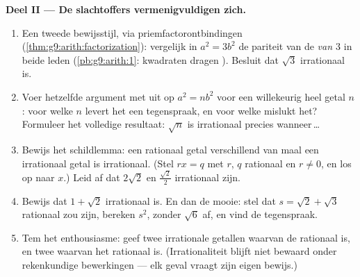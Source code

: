 \begin{problem}
\medskip
\noindent\textbf{Deel II --- De slachtoffers vermenigvuldigen zich.}
\begin{enumerate}[resume]
  \item Een tweede bewijsstijl, via priemfactorontbindingen
        (\cref{thm:g9:arith:factorization}): vergelijk in $a^2 = 3b^2$ de pariteit
        van de \emph{ van $3$} in beide leden (\cref{pb:g9:arith:1}:
        kwadraten dragen  ). Besluit dat $\sqrt3$ irrationaal is.
  \item Voer hetzelfde argument met  uit op $a^2 = n b^2$ voor een
        willekeurig heel getal $n$: voor welke $n$ levert het een tegenspraak, en
        voor welke mislukt het? Formuleer het volledige resultaat: $\sqrt n$ is
        irrationaal precies wanneer\,\dots
  \item Bewijs het schildlemma: een rationaal getal verschillend van  maal een
        irrationaal getal is irrationaal. (Stel $r x = q$ met $r$, $q$ rationaal en
        $r \neq 0$, en los op naar $x$.) Leid af dat $2\sqrt2$ en
        $\frac{\sqrt2}{2}$ irrationaal zijn.
  \item Bewijs dat $1 + \sqrt2$ irrationaal is. En dan de mooie: stel dat
        $s = \sqrt2 + \sqrt3$ rationaal zou zijn, bereken $s^2$, zonder $\sqrt6$
        af, en vind de tegenspraak.
  \item Tem het enthousiasme: geef twee irrationale getallen waarvan de
        \emph{} rationaal is, en twee waarvan het \emph{} rationaal is.
        (Irrationaliteit blijft niet bewaard onder rekenkundige bewerkingen ---
        elk geval vraagt zijn eigen bewijs.)
\end{enumerate}


\end{problem}

